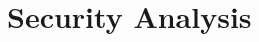 \documentclass{ieeeaccess}
\begin{document}




\section{Security Analysis} \label{sec:sec}
\end{document}
